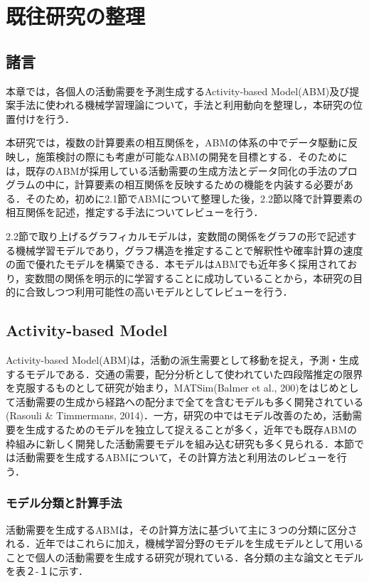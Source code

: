 \chapter{既往研究の整理}
\label{2}
\section{諸言}\label{2.1}

本章では，各個人の活動需要を予測生成するActivity-based Model(ABM)及び提案手法に使われる機械学習理論について，手法と利用動向を整理し，本研究の位置付けを行う．

本研究では，複数の計算要素の相互関係を，ABMの体系の中でデータ駆動に反映し，施策検討の際にも考慮が可能なABMの開発を目標とする．そのためには，既存のABMが採用している活動需要の生成方法とデータ同化の手法のプログラムの中に，計算要素の相互関係を反映するための機能を内装する必要がある．そのため，初めに2.1節でABMについて整理した後，2.2節以降で計算要素の相互関係を記述，推定する手法についてレビューを行う．

2.2節で取り上げるグラフィカルモデルは，変数間の関係をグラフの形で記述する機械学習モデルであり，グラフ構造を推定することで解釈性や確率計算の速度の面で優れたモデルを構築できる．本モデルはABMでも近年多く採用されており，変数間の関係を明示的に学習することに成功していることから，本研究の目的に合致しつつ利用可能性の高いモデルとしてレビューを行う．

\section{Activity-based Model}\label{2.2}

Activity-based Model(ABM)は，活動の派生需要として移動を捉え，予測・生成するモデルである．交通の需要，配分分析として使われていた四段階推定の限界を克服するものとして研究が始まり，MATSim(Balmer et al., 200)をはじめとして活動需要の生成から経路への配分まで全てを含むモデルも多く開発されている(Rasouli \& Timmermans, 2014)．一方，研究の中ではモデル改善のため，活動需要を生成するためのモデルを独立して捉えることが多く，近年でも既存ABMの枠組みに新しく開発した活動需要モデルを組み込む研究も多く見られる．本節では活動需要を生成するABMについて，その計算方法と利用法のレビューを行う．

\subsection{モデル分類と計算手法}\label{2.2.1}

活動需要を生成するABMは，その計算方法に基づいて主に３つの分類に区分される．近年ではこれらに加え，機械学習分野のモデルを生成モデルとして用いることで個人の活動需要を生成する研究が現れている．各分類の主な論文とモデルを表２-１に示す．

